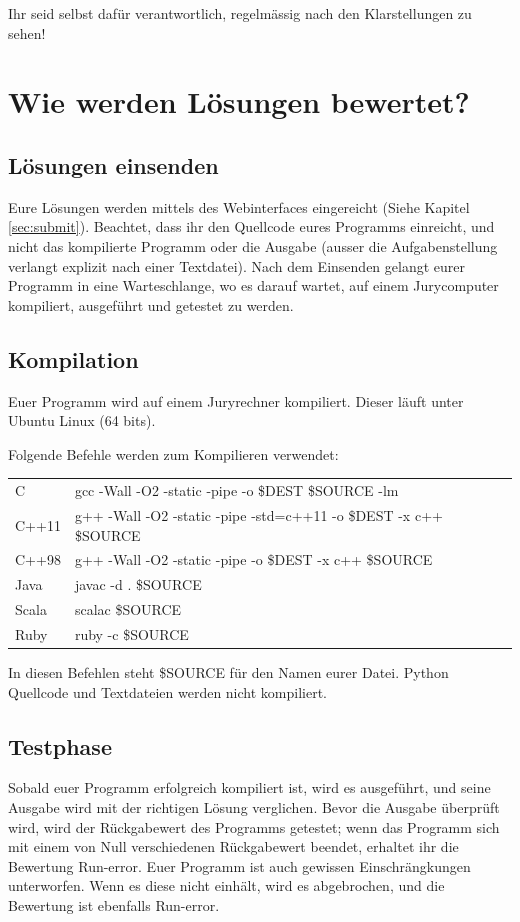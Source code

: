 Ihr seid selbst dafür verantwortlich, regelmässig nach den Klarstellungen zu
sehen!

\section[Bewertung]{Wie werden Lösungen bewertet?}
\subsection{Lösungen einsenden}
Eure Lösungen werden mittels des Webinterfaces eingereicht (Siehe Kapitel
\ref{sec:submit}). Beachtet, dass ihr den Quellcode eures Programms einreicht,
und nicht das kompilierte Programm oder die Ausgabe (ausser die Aufgabenstellung
verlangt explizit nach einer Textdatei). Nach dem Einsenden gelangt
eurer Programm in eine Warteschlange, wo es darauf wartet, auf einem
Jurycomputer kompiliert, ausgeführt und getestet zu werden.

\subsection{Kompilation}
Euer Programm wird auf einem Juryrechner kompiliert. Dieser läuft unter Ubuntu
Linux (64 bits).

Folgende Befehle werden zum Kompilieren verwendet:
\begin{center}
\begin{tabular}{l|p{14cm}}
C&
gcc -Wall -O2 -static -pipe -o \$DEST \$SOURCE -lm \\
C++11&
g++ -Wall -O2 -static -pipe -std=c++11 -o \$DEST -x c++ \$SOURCE \\
C++98&
g++ -Wall -O2 -static -pipe -o \$DEST -x c++ \$SOURCE \\
Java&
javac -d . \$SOURCE \\
Scala&
scalac \$SOURCE \\
Ruby&
ruby -c \$SOURCE \\
\end{tabular}
\end{center}
In diesen Befehlen steht \$SOURCE für den Namen eurer Datei.
Python Quellcode und Textdateien werden nicht kompiliert.

\subsection{Testphase}
Sobald euer Programm erfolgreich kompiliert ist, wird es ausgeführt, und seine
Ausgabe wird mit der richtigen Lösung verglichen. Bevor die Ausgabe überprüft
wird, wird der Rückgabewert des Programms getestet; wenn das Programm sich mit
einem von Null verschiedenen Rückgabewert beendet, erhaltet ihr die Bewertung
\glqq Run-error\grqq{}. Euer Programm ist auch gewissen Einschrängkungen
unterworfen. Wenn es diese nicht einhält, wird es abgebrochen, und die Bewertung
ist ebenfalls \glqq Run-error\grqq{}.

